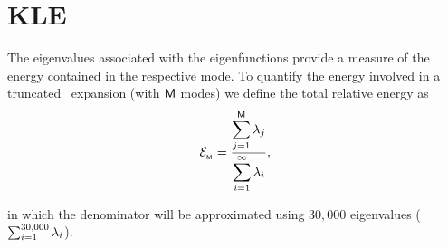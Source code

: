 \section{KLE}

The eigenvalues associated with the eigenfunctions provide
a measure of the energy contained in the respective mode.
To quantify the energy involved in a truncated \kl\ expansion (with $\textsf{M}$ modes) we define the total relative energy as
\begin{equation}
 \mathcal{E}_{_{\textsf{M}}} = \dfrac{\displaystyle\sum_{j=1}^{\textsf{M}}\lambda_{j}}{\displaystyle\sum_{i=1}^{\infty}\lambda_{i}},
\end{equation}

\noindent in which the denominator will be approximated using $30,000$ eigenvalues ($\sum_{i=1}^{30,000}\lambda_{i}$).


